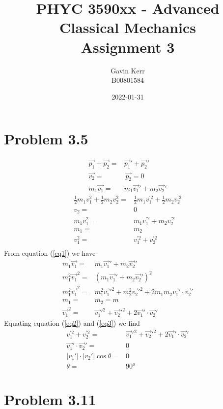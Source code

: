 \documentclass[12pt, a4paper]{article}
\title{PHYC 3590xx - Advanced Classical Mechanics\\Assignment 3}
\author{Gavin Kerr\\B00801584}
\date{2022-01-31}
\begin{document}
\maketitle


\section*{Problem 3.5}
\begin{align}
\vec{p_1} + \vec{p_2} =& \vec{p_1}' + \vec{p_2}'
\\
\vec{v_2} =& \, \vec{p_2} = 0
\\
m_1\vec{v_1} =& m_1\vec{v_1}' + m_2\vec{v_2}' \label{eq1}
\end{align}
\begin{align}
\tfrac{1}{2}m_1v_1^2 + \tfrac{1}{2}m_2v_2^2 =& \tfrac{1}{2}m_1v_1^{'2} + \tfrac{1}{2}m_2v_2^{'2}
\\
v_2 =& 0
\\
m_1v_1^2 =& m_1v_1^{'2} + m_2v_2^{'2} 
\\
m_1 =& m_2
\\
v_1^2 =& v_1^{'2} + v_2^{'2} \label{eq2}
\\
\end{align}
From equation (\ref{eq1}) we have
\begin{align}
m_1\vec{v_1} =& m_1\vec{v_1}' + m_2\vec{v_2}' 
\\
m_1^2\vec{v_1}^2 =& (m_1\vec{v_1}' + m_2\vec{v_2}')^2 
\\
m_1^2\vec{v_1}^2 =& m_1^2 \vec{v_1}'^2  + m_2^2 \vec{v_2}'^2 + 2m_1m_2\vec{v_1}'\cdot\vec{v_2}'
\\
m_1 =& m_2 = m
\\
\vec{v_1}^2 =& \vec{v_1}'^2  + \vec{v_2}'^2 + 2\vec{v_1}'\cdot\vec{v_2}' \label{eq3}
\end{align}
Equating equation (\ref{eq2}) and (\ref{eq3}) we find
\begin{align*}
v_1^{'2} + v_2^{'2} =& \vec{v_1}'^2  + \vec{v_2}'^2 + 2\vec{v_1}'\cdot\vec{v_2}'
\\
\vec{v_1}'\cdot\vec{v_2}' =& 0
\\
|v_1'| \cdot |v_2'| \cos\theta =& 0
\\
\theta =& \boxed{90^o}
\end{align*}




\pagebreak
\section*{Problem 3.11}
\end{document}
